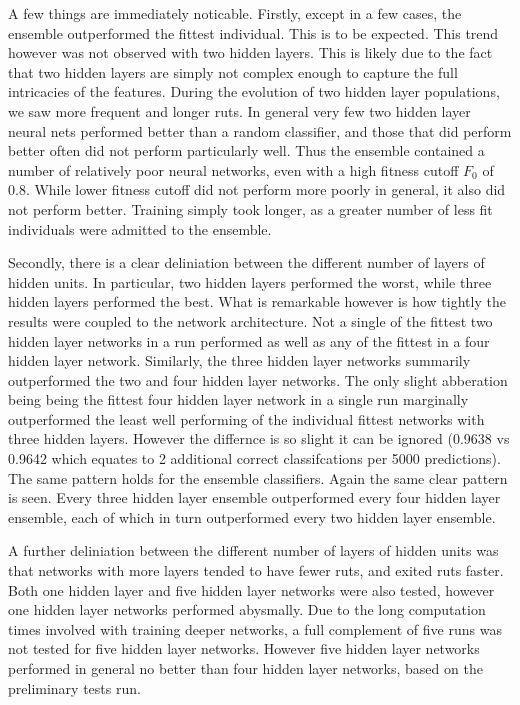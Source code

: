 \documentclass{article}
\DeclareMathOperator{\1}{\mathbbm{1}}
\begin{document}
A few things are immediately noticable. Firstly, except in a few cases, the ensemble outperformed the fittest individual. 
This is to be expected. This trend however was not observed with two hidden layers. This is likely due to the fact that
two hidden layers are simply not complex enough to capture the full intricacies of the features. During the evolution of
two hidden layer populations, we saw more frequent and longer ruts. In general very few two hidden layer neural nets
performed better than a random classifier, and those that did perform better often did not perform particularly well. 
Thus the ensemble contained a number of relatively poor neural networks, even with a high fitness cutoff $F_0$ of 0.8.
While lower fitness cutoff did not perform more poorly in general, it also did not perform better. Training simply
took longer, as a greater number of less fit individuals were admitted to the ensemble.

Secondly, there is a clear deliniation between the different number of layers of hidden units. In particular, two hidden
layers performed the worst, while three hidden layers performed the best. What is remarkable however is how tightly the 
results were coupled to the network architecture. Not a single of the fittest two hidden layer networks in a run
performed as well as any of the fittest in a four hidden layer network. Similarly, the three hidden layer networks summarily
outperformed the two and four hidden layer networks. The only slight abberation being being the fittest four hidden layer
network in a single run marginally outperformed the least well performing of the individual fittest networks with three hidden
layers. However the differnce is so slight it can be ignored (0.9638 vs 0.9642 which equates to 2 additional correct classifcations
per 5000 predictions). The same pattern holds for the ensemble classifiers. Again the same clear pattern is seen. Every three
hidden layer ensemble outperformed every four hidden layer ensemble, each of which in turn outperformed every two hidden layer
ensemble. 

A further deliniation between the different number of layers of hidden units was that networks with more layers tended to have fewer
ruts, and exited ruts faster. Both one hidden layer and five hidden layer networks were also tested, however one hidden layer networks 
performed abysmally. Due to the long computation times involved with training deeper networks, a full complement of five runs was not
tested for five hidden layer networks. However five hidden layer networks performed in general no better than four hidden layer networks,
based on the preliminary tests run. 
\end{document}
